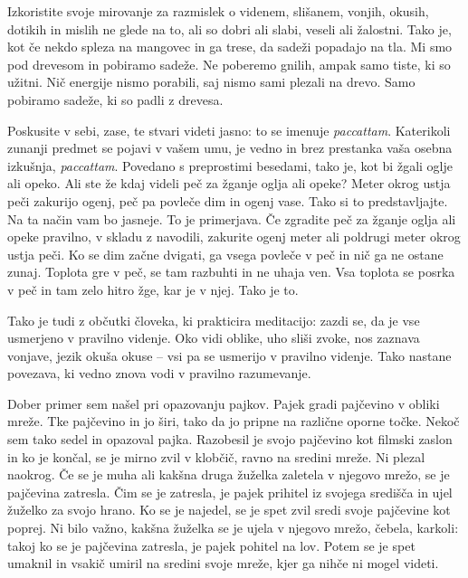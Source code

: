 
Izkoristite svoje mirovanje za razmislek o videnem, slišanem, vonjih, okusih, dotikih in mislih ne glede na to, ali so dobri ali slabi, veseli ali žalostni. Tako je, kot če nekdo spleza na mangovec in ga trese, da sadeži popadajo na tla. Mi smo pod drevesom in pobiramo sadeže. Ne poberemo gnilih, ampak samo tiste, ki so užitni. Nič energije nismo porabili, saj nismo sami plezali na drevo. Samo pobiramo sadeže, ki so padli z drevesa.

\clearpage


Poskusite v sebi, zase, te stvari videti jasno: to se imenuje \emph{paccattam}. Katerikoli zunanji predmet se pojavi v vašem umu, je vedno in brez prestanka vaša osebna izkušnja, \emph{paccattam}. Povedano s preprostimi besedami, tako je, kot bi žgali oglje ali opeko. Ali ste že kdaj videli peč za žganje oglja ali opeke? Meter okrog ustja peči zakurijo ogenj, peč pa povleče dim in ogenj vase. Tako si to predstavljajte. Na ta način vam bo jasneje. To je primerjava. Če zgradite peč za žganje oglja ali opeke pravilno, v skladu z navodili, zakurite ogenj meter ali poldrugi meter okrog ustja peči. Ko se dim začne dvigati, ga vsega povleče v peč in nič ga ne ostane zunaj. Toplota gre v peč, se tam razbuhti in ne uhaja ven. Vsa toplota se posrka v peč in tam zelo hitro žge, kar je v njej. Tako je to.

Tako je tudi z občutki človeka, ki prakticira meditacijo: zazdi se, da je vse usmerjeno v pravilno videnje. Oko vidi oblike, uho sliši zvoke, nos zaznava vonjave, jezik okuša okuse – vsi pa se usmerijo v pravilno videnje. Tako nastane povezava, ki vedno znova vodi v pravilno razumevanje.

\clearpage


Dober primer sem našel pri opazovanju pajkov. Pajek gradi pajčevino v obliki mreže. Tke pajčevino in jo širi, tako da jo pripne na različne oporne točke. Nekoč sem tako sedel in opazoval pajka. Razobesil je svojo pajčevino kot filmski zaslon in ko je končal, se je mirno zvil v klobčič, ravno na sredini mreže. Ni plezal naokrog. Če se je muha ali kakšna druga žuželka zaletela v njegovo mrežo, se je pajčevina zatresla. Čim se je zatresla, je pajek prihitel iz svojega središča in ujel žuželko za svojo hrano. Ko se je najedel, se je spet zvil sredi svoje pajčevine kot poprej. Ni bilo važno, kakšna žuželka se je ujela v njegovo mrežo, čebela, karkoli: takoj ko se je pajčevina zatresla, je pajek pohitel na lov. Potem se je spet umaknil in vsakič umiril na sredini svoje mreže, kjer ga nihče ni mogel videti.

